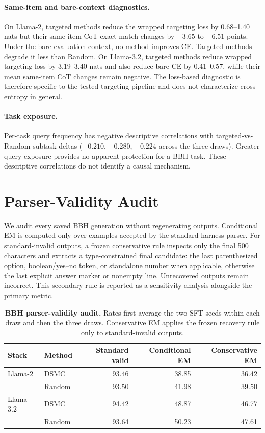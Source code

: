 \documentclass{article}
\newcommand{\method}{\textsc{DSMC}}
\begin{document}
\paragraph{Same-item and bare-context diagnostics.}
On Llama-2, targeted methods reduce the wrapped targeting loss by
0.68--1.40 nats but their same-item CoT exact match changes by
$-3.65$ to $-6.51$ points. Under the bare evaluation context, no method
improves CE. Targeted methods degrade it less than Random. On Llama-3.2,
targeted methods reduce wrapped targeting loss by 3.19--3.40 nats and also
reduce bare CE by 0.41--0.57, while their mean same-item CoT changes remain
negative. The loss-based diagnostic is therefore specific to the tested
targeting pipeline and does not characterize cross-entropy in general.

\paragraph{Task exposure.}
Per-task query frequency has negative descriptive correlations with
targeted-vs-Random subtask deltas ($-0.210$, $-0.280$, $-0.224$ across the
three draws). Greater query exposure provides no apparent protection for a BBH
task. These descriptive correlations do not identify a causal mechanism.

\section{Parser-Validity Audit}
\label{app:parser}

We audit every saved BBH generation without regenerating outputs. Conditional
EM is computed only over examples accepted by the standard harness parser.
For standard-invalid outputs, a frozen conservative rule inspects only the
final 500 characters and extracts a type-constrained final candidate: the last
parenthesized option, boolean/yes--no token, or standalone number when
applicable, otherwise the last explicit answer marker or nonempty line.
Unrecovered outputs remain incorrect. This secondary rule is reported as a
sensitivity analysis alongside the primary metric.

\begin{table}[h]
\caption{\textbf{BBH parser-validity audit.}
Rates first average the two SFT seeds within each draw and then the three
draws. Conservative EM applies the frozen recovery rule only to
standard-invalid outputs.}
\label{tab:parser}
\centering
\small
\begin{tabular}{llrrr}
\toprule
Stack & Method & Standard valid & Conditional EM & Conservative EM \\
\midrule
Llama-2 & \method{} & 93.46 & 38.85 & 36.42 \\
        & Random & 93.50 & 41.98 & 39.50 \\
Llama-3.2 & \method{} & 94.42 & 48.87 & 46.77 \\
          & Random & 93.64 & 50.23 & 47.61 \\
\bottomrule
\end{tabular}
\end{table}
\end{document}
